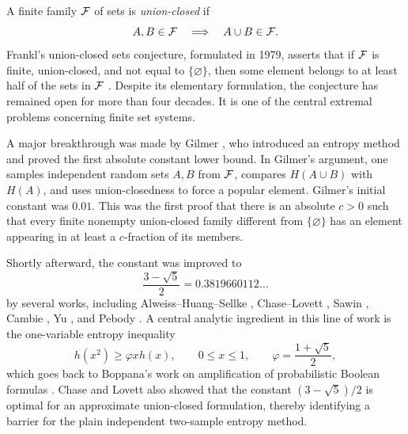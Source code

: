 A finite family \(\mathcal{F}\) of sets is \emph{union-closed} if
\begin{equation}
  A,B\in\mathcal{F} \quad\Longrightarrow\quad A\cup B\in\mathcal{F}.
\end{equation}
Frankl's union-closed sets conjecture, formulated in 1979, asserts that if
\(\mathcal{F}\) is finite, union-closed, and not equal to \(\{\varnothing\}\), then
some element belongs to at least half of the sets in \(\mathcal{F}\)
\cite{Frankl1979,BruhnSchaudt2015}.  Despite its elementary formulation, the
conjecture has remained open for more than four decades.  It is one of the
central extremal problems concerning finite set systems.

A major breakthrough was made by Gilmer \cite{Gilmer2022}, who introduced an
entropy method and proved the first absolute constant lower bound.  In
Gilmer's argument, one samples independent random sets \(A,B\) from
\(\mathcal{F}\), compares \(H(A\cup B)\) with \(H(A)\), and uses union-closedness to
force a popular element.  Gilmer's initial constant was \(0.01\).  This was the
first proof that there is an absolute \(c>0\) such that every finite nonempty
union-closed family different from \(\{\varnothing\}\) has an element appearing
in at least a \(c\)-fraction of its members.

Shortly afterward, the constant was improved to
\begin{equation}
  \frac{3-\sqrt 5}{2}=0.3819660112\ldots
\end{equation}
by several works, including Alweiss--Huang--Sellke
\cite{AlweissHuangSellke2024}, Chase--Lovett \cite{ChaseLovett2022}, Sawin
\cite{Sawin2022}, Cambie \cite{Cambie2022}, Yu \cite{Yu2023}, and Pebody
\cite{Pebody2022}.  A central analytic ingredient in this line of work is the
one-variable entropy inequality
\begin{equation}\label{eq:intro_boppana}
  h(x^2)\ge \varphi xh(x),
  \qquad
  0\le x\le1,
  \qquad
  \varphi=\frac{1+\sqrt5}{2},
\end{equation}
which goes back to Boppana's work on amplification of probabilistic Boolean
formulas \cite{Boppana1985}.  Chase and Lovett also showed that the constant
\((3-\sqrt5)/2\) is optimal for an approximate union-closed formulation,
thereby identifying a barrier for the plain independent two-sample entropy
method.

